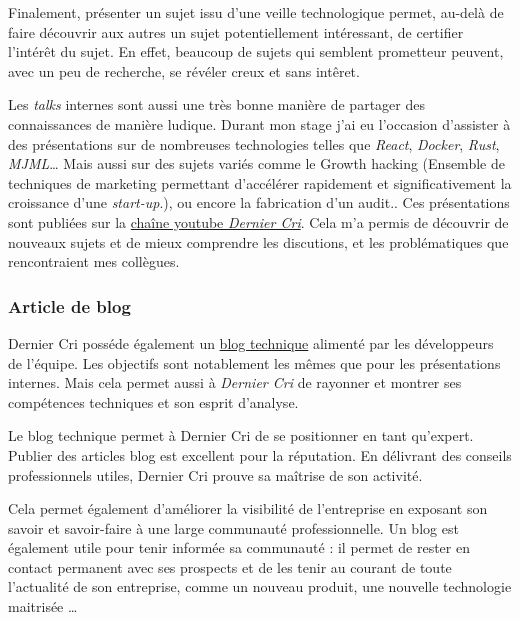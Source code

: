 Finalement, présenter un sujet issu d'une veille technologique permet,
au-delà de faire découvrir aux autres un sujet potentiellement
intéressant, de certifier l'intérêt du sujet. En effet, beaucoup de
sujets qui semblent prometteur peuvent, avec un peu de recherche, se
révéler creux et sans intêret.

\bigskip

Les \emph{talks} internes sont aussi une très bonne manière de partager
des connaissances de manière ludique. Durant mon stage j'ai eu
l'occasion d'assister à des présentations sur de nombreuses technologies
telles que \emph{React}, \emph{Docker}, \emph{Rust}, \emph{MJML}\ldots{}
Mais aussi sur des sujets variés comme le Growth hacking (Ensemble de
techniques de marketing permettant d'accélérer rapidement et
significativement la croissance d'une \emph{start-up}.), ou encore la
fabrication d'un audit.. Ces présentations sont publiées sur la
\href{https://www.youtube.com/channel/UCDfdBlzldhg_PEu3xZTPsHg}{chaîne
youtube \emph{Dernier Cri}}. Cela m'a permis de découvrir de nouveaux
sujets et de mieux comprendre les discutions, et les problématiques que
rencontraient mes collègues.

\bigskip

\subsubsection{Article de blog}\label{article-de-blog}

\bigskip

Dernier Cri posséde également un
\href{http://derniercri.io/tech-blog}{blog technique} alimenté par les
développeurs de l'équipe. Les objectifs sont notablement les mêmes que
pour les présentations internes. Mais cela permet aussi à \emph{Dernier
Cri} de rayonner et montrer ses compétences techniques et son esprit
d'analyse.

\bigskip

Le blog technique permet à Dernier Cri de se positionner en tant
qu'expert. Publier des articles blog est excellent pour la réputation.
En délivrant des conseils professionnels utiles, Dernier Cri prouve sa
maîtrise de son activité.

\bigskip

Cela permet également d'améliorer la visibilité de l'entreprise en
exposant son savoir et savoir-faire à une large communauté
professionnelle. Un blog est également utile pour tenir informée sa
communauté : il permet de rester en contact permanent avec ses prospects
et de les tenir au courant de toute l'actualité de son entreprise, comme
un nouveau produit, une nouvelle technologie maitrisée \ldots{}

